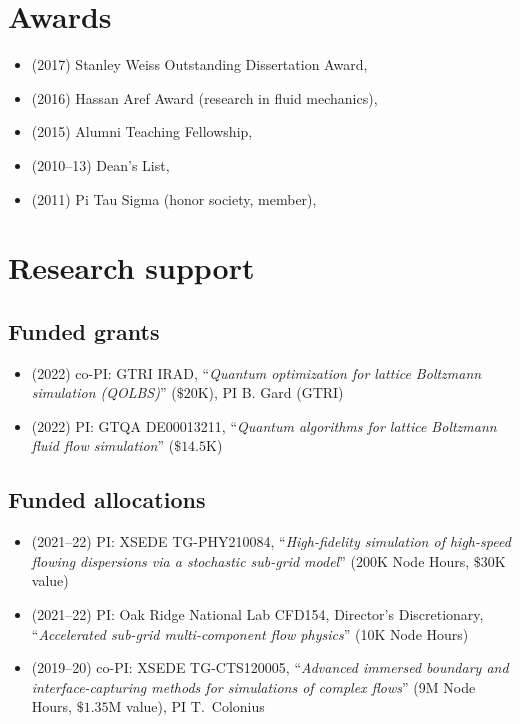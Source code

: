 \section{Awards}

\begin{itemize}
    \item (2017) Stanley Weiss Outstanding Dissertation Award, \UIUC
    \item (2016) Hassan Aref Award (research in fluid mechanics), \UIUC
    \item (2015) Alumni Teaching Fellowship, \UIUC
    \item (2010--13) Dean's List, \UMD
    \item (2011) Pi Tau Sigma (honor society, member), \UMD
\end{itemize}

\section{Research support}

\subsection{Funded grants}

\begin{itemize}
    \item (2022) co-PI: GTRI IRAD, ``\textit{Quantum optimization for lattice Boltzmann simulation (QOLBS)}'' ($\$20$K), PI B. Gard (GTRI)
    \item (2022) PI: GTQA DE00013211, ``\textit{Quantum algorithms for lattice Boltzmann fluid flow simulation}'' ($\$14.5$K)
\end{itemize}

\subsection{Funded allocations}

\begin{itemize}
    \item (2021--22) PI: XSEDE TG-PHY210084, ``\textit{High-fidelity simulation of high-speed flowing dispersions via a stochastic sub-grid model}''  (200K Node Hours, $\$30$K value)
    \item (2021--22) PI: Oak Ridge National Lab CFD154, Director's Discretionary, ``\textit{Accelerated sub-grid multi-component flow physics}'' (10K Node Hours)
    \item (2019--20) co-PI: XSEDE TG-CTS120005, ``\textit{Advanced immersed boundary and interface-capturing methods for simulations of complex flows}'' (9M Node Hours, $\$1.35$M value), PI T.\ Colonius
\end{itemize}

